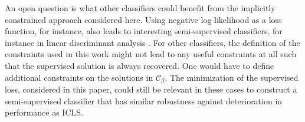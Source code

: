 \documentclass{llncs}
\newcommand{\Cb}{\mathcal{C}_{\beta}}
\begin{document}
% 

An open question is what other classifiers could benefit from the implicitly constrained approach considered here. Using negative log likelihood as a loss function, for instance, also leads to interesting semi-supervised classifiers, for instance in linear discriminant analysis \cite{Krijthe2014}. For other classifiers, the definition of the constraints used in this work might not lead to any useful constraints at all such that the supervised solution is always recovered. One would have to define additional constraints on the solutions in $\Cb$. The minimization of the supervised loss, considered in this paper, could still be relevant in these cases to construct a semi-supervised classifier that has similar robustness against deterioration in performance as ICLS.

\end{document}
